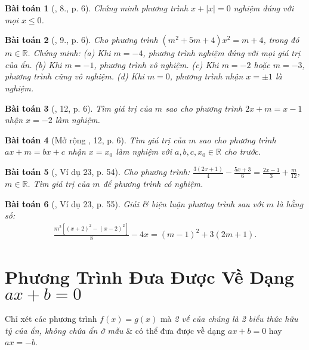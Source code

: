 \documentclass{article}
\newtheorem{baitoan}{Bài toán}
\begin{document}
\begin{baitoan}[\cite{SBT_Toan_8_tap_2}, 8., p. 6]
	Chứng minh phương trình $x + |x| = 0$ nghiệm đúng với mọi $x\le0$.
\end{baitoan}

\begin{baitoan}[\cite{SBT_Toan_8_tap_2}, 9., p. 6]
	Cho phương trình $(m^2 + 5m + 4)x^2 = m + 4$, trong đó $m\in\mathbb{R}$. Chứng minh: (a) Khi $m = -4$, phương trình nghiệm đúng với mọi giá trị của ẩn. (b) Khi $m = -1$, phương trình vô nghiệm. (c) Khi $m = -2$ hoặc $m = -3$, phương trình cũng vô nghiệm. (d) Khi $m = 0$, phương trình nhận $x = \pm1$ là nghiệm.
\end{baitoan}

\begin{baitoan}[\cite{SBT_Toan_8_tap_2}, 12, p. 6]
	Tìm giá trị của $m$ sao cho phương trình $2x + m = x - 1$ nhận $x = -2$ làm nghiệm.
\end{baitoan}

\begin{baitoan}[Mở rộng \cite{SBT_Toan_8_tap_2}, 12, p. 6]
	Tìm giá trị của $m$ sao cho phương trình $ax + m = bx + c$ nhận $x = x_0$ làm nghiệm với $a,b,c,x_0\in\mathbb{R}$ cho trước.
\end{baitoan}

\begin{baitoan}[\cite{Tuyen_Toan_8}, Ví dụ 23, p. 54]
	Cho phương trình: $\frac{3(2x + 1)}{4} - \frac{5x + 3}{6} = \frac{2x - 1}{3} + \frac{m}{12}$, $m\in\mathbb{R}$. Tìm giá trị của $m$ để phương trình có nghiệm.
\end{baitoan}

\begin{baitoan}[\cite{Tuyen_Toan_8}, Ví dụ 23, p. 55]
	Giải \& biện luận phương trình sau với $m$ là hằng số:
	\begin{align*}
		\frac{m^2[(x + 2)^2 - (x - 2)^2]}{8} - 4x = (m - 1)^2 + 3(2m + 1).
	\end{align*}
\end{baitoan}


\section{Phương Trình Đưa Được Về Dạng $ax + b = 0$}
Chỉ xét các phương trình $f(x) = g(x)$ mà \textit{2 vế của chúng là 2 biểu thức hữu tỷ của ẩn, không chứa ẩn ở mẫu} \& có thể đưa được về dạng $ax + b = 0$ hay $ax = -b$.
\end{document}
